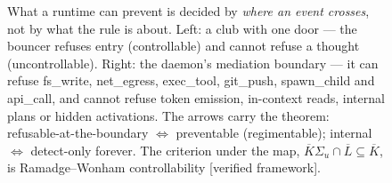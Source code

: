 \begin{figure}[t]
{%
}
\caption{What a runtime can prevent is decided by \emph{where an event crosses}, not by what the rule is about. Left: a club
with one door --- the bouncer refuses entry (controllable) and cannot refuse a thought (uncontrollable). Right: the daemon's
mediation boundary --- it can refuse fs\_write, net\_egress, exec\_tool, git\_push, spawn\_child and api\_call, and cannot
refuse token emission, in-context reads, internal plans or hidden activations. The arrows carry the theorem:
refusable-at-the-boundary $\Leftrightarrow$ preventable (regimentable); internal $\Leftrightarrow$ detect-only forever. The
criterion under the map, $\overline{K}\Sigma_u\cap\overline{L}\subseteq\overline{K}$, is Ramadge--Wonham controllability
[verified framework].}
\label{fig:relation}
\end{figure}
